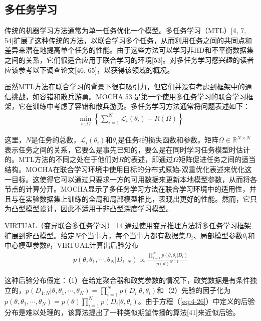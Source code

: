 \subsection{多任务学习}
传统的机器学习方法通常为单一任务优化一个模型。多任务学习（MTL）[4, 7, 54]扩展了这种传统的方法，以联合学习多个任务，从而利用任务之间的共同点和差异来潜在地提高单个任务的性能。由于这些方法可以学习非IID和不平衡数据集之间的关系，它们很适合应用于联合学习的环境[53]。对多任务学习感兴趣的读者应该参考以下调查论文[46, 65]，以获得该领域的概况。

虽然MTL方法在联合学习的背景下很有吸引力，但它们并没有考虑到框架中的通信挑战，如容错和散兵游勇。MOCHA[53]是第一个使用多任务学习的联合学习框架，它在训练中考虑了容错和散兵游勇。多任务学习方法通常将问题表述如下：
\begin{align}\label{eq:4-25}
	\min_{w, \Omega} \left\{ \sum_{i=1}^{N}\mathcal{L}_{i}(\theta_{i}) + R(\Omega) \right\}
\end{align}

这里，$N$是任务的总数，$\mathcal{L}_{i}(\theta_{i})$和$\theta_{i}$是任务$i$的损失函数和参数。矩阵$\Omega \in \mathbb{R}^{N \times N}$表示任务之间的关系，它要么是事先已知的，要么是在同时学习任务模型时估计的。MTL方法的不同之处在于他们对$R$的表述，即通过$\Omega$矩阵促进任务之间的适当结构。MOCHA在联合学习环境中使用目标的分布式原始-双重优化表述来优化这一目标。这使得它可以通过只要求一方的可用数据来更新本地模型参数，从而将各节点的计算分开。MOCHA显示了多任务学习方法在联合学习环境中的适用性，并且与在实验数据集上训练的全局和局部模型相比，表现出更好的性能。然而，它只为凸型模型设计，因此不适用于非凸型深度学习模型。

VIRTUAL（变异联合多任务学习）[14]通过使用变异推理方法将多任务学习框架扩展到非凸模型。给定$N$个当事方，每个当事方都有数据集$D_{i}$、局部模型参数$\theta_{i}$和中心模型参数$\theta$，VIRTUAL计算出后验分布
\begin{align}\label{eq:4-26}
	p(\theta, \theta_{1}, \cdots, \theta_{N} | D_{1:N}) \propto \frac{\prod_{i=1}^{N} p(\theta, \theta_{i} | D_{i})}{p(\theta)^{N-1}}
\end{align}

这种后验分布假定：（1）在给定聚合器和政党参数的情况下，政党数据是有条件独立的，$p(D_{1:N} | \theta, \theta_{1}, \cdots, \theta_{N}) = \prod_{i=1}^{N} p(D_{i} | \theta, \theta_{i})$和（2）先验的因子化为$p(\theta, \theta_{1}, \cdots, \theta_{N}) = p(\theta) \prod_{i=1}^{N}p(D_{i} | \theta, \theta_{i})$。由于方程（\ref{eq:4-26}）中定义的后验分布是难以处理的，该算法提出了一种类似期望传播的算法[41]来近似后验。

